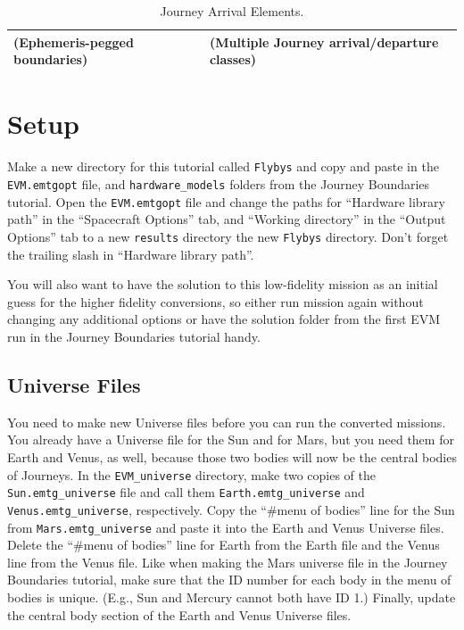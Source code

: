 \documentclass[11pt]{article}
\begin{document}
\begin{table}[H]
\begin{small}
\begin{tabularx}{\linewidth} { >{\arraybackslash} X >{\arraybackslash} X >{\arraybackslash} X}
			(Ephemeris-pegged boundaries) &  & (Multiple Journey arrival/departure classes) \\
 			\hline
		\end{tabularx}
	\end{small}
	\caption{\label{tab:emtg_conversion_scripts}Journey Arrival Elements.}
\end{table}

\section{Setup}
\label{sec:setup}

Make a new directory for this tutorial called \texttt{Flybys} and copy and paste in the \texttt{EVM.emtgopt} file, and \texttt{hardware\_models} folders from the Journey Boundaries tutorial. Open the \texttt{EVM.emtgopt} file and change the 
paths for “Hardware library path” in the ``Spacecraft Options'' tab, and ``Working directory'' in the ``Output Options'' tab to a new \texttt{results} directory the new \texttt{Flybys} directory. Don’t forget the trailing slash in ``Hardware library path''.

\noindent You will also want to have the solution to this low-fidelity mission as an initial guess for the higher fidelity conversions, so either run mission again without changing any additional options or have the solution folder from the first EVM run in the Journey Boundaries tutorial handy. 

\subsection{Universe Files}
\label{sec:universe_files}

You need to make new Universe files before you can run the converted missions. You already have a Universe file for the Sun and for Mars, but you need them for Earth and Venus, as well, because those two bodies will now be the central bodies of Journeys. In the \texttt{EVM\_universe} directory, make two copies of the \texttt{Sun.emtg\_universe} file and call them \texttt{Earth.emtg\_universe} and \texttt{Venus.emtg\_universe}, respectively. Copy the ``\#menu of bodies'' line for the Sun from \texttt{Mars.emtg\_universe} and paste it into the Earth and Venus Universe files. Delete the ``\#menu of bodies'' line for Earth from the Earth file and the Venus line from the Venus file. Like when making the Mars universe file in the Journey Boundaries tutorial, make sure that the ID number for each body in the menu of bodies is unique. (E.g., Sun and Mercury cannot both have ID 1.) Finally, update the central body section of the Earth and Venus Universe files. 
\end{document}
